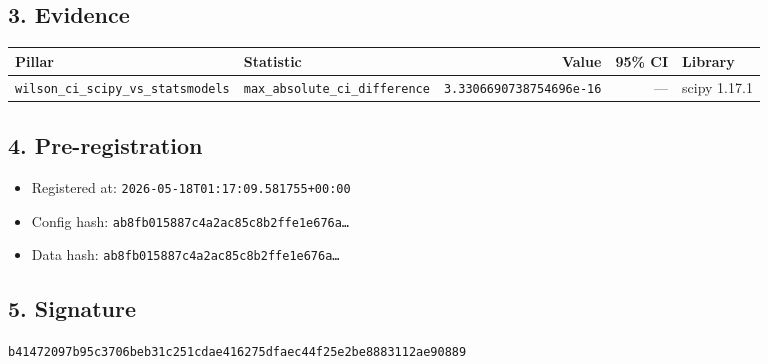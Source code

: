 \documentclass{article}
\begin{document}
\subsection*{3. Evidence}
\begin{tabular}{llrrl}\toprule
\textbf{Pillar} & \textbf{Statistic} & \textbf{Value} & \textbf{95\% CI} & \textbf{Library} \\\midrule
\texttt{wilson\_ci\_scipy\_vs\_statsmodels} & \texttt{max\_absolute\_ci\_difference} & \texttt{3.3306690738754696e-16} & --- & scipy 1.17.1 \\
\bottomrule\end{tabular}
\subsection*{4. Pre-registration}
\begin{itemize}
\item Registered at: \texttt{2026-05-18T01:17:09.581755+00:00}
\item Config hash: \texttt{ab8fb015887c4a2ac85c8b2ffe1e676a\dots}
\item Data hash: \texttt{ab8fb015887c4a2ac85c8b2ffe1e676a\dots}
\end{itemize}
\subsection*{5. Signature}
\texttt{b41472097b95c3706beb31c251cdae416275dfaec44f25e2be8883112ae90889}\\
\end{document}

